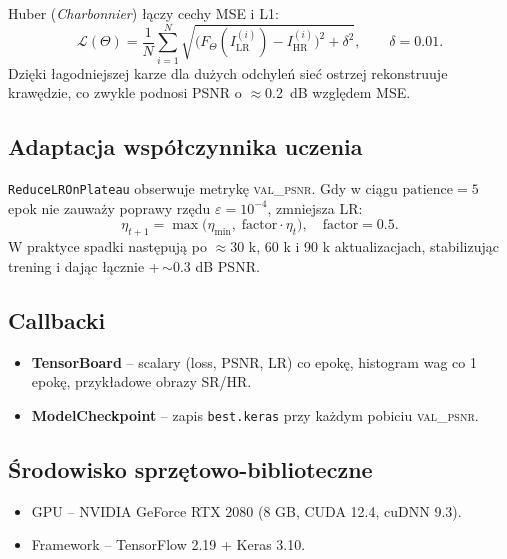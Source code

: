 \documentclass[11pt]{article}
\begin{document}
Huber (\textit{Charbonnier}) łączy cechy MSE i L1:
\begin{equation}
  \mathcal L(\Theta)=
  \frac{1}{N}\sum_{i=1}^{N}
  \sqrt{\bigl(F_\Theta(I^{(i)}_\mathrm{LR})-
              I^{(i)}_\mathrm{HR}\bigr)^{2}+\delta^{2}},
  \qquad \delta=0.01.
  \label{eq:huber}
\end{equation}
Dzięki łagodniejszej karze dla dużych odchyleń sieć ostrzej rekonstruuje
krawędzie, co zwykle podnosi PSNR o \(\approx\)\SI{0.2}{dB} względem MSE.

\subsection{Adaptacja współczynnika uczenia}

\texttt{ReduceLROnPlateau} obserwuje metrykę \textsc{val\_psnr}.
Gdy w ciągu \(\text{patience}=5\) epok nie zauważy poprawy rzędu
\(\varepsilon=10^{-4}\), zmniejsza LR:
\begin{equation}
  \eta_{t+1} =
  \max\bigl(\eta_\text{min},\;
            \text{factor}\cdot\eta_{t}\bigr),
  \quad
  \text{factor}=0.5.
  \label{eq:rlrop}
\end{equation}
W praktyce spadki następują po \(\approx\)30 k, 60 k i 90 k
aktualizacjach, stabilizując trening i dając łącznie
+\,\(\sim\)0.3 dB PSNR.

\subsection{Callbacki}

\begin{itemize}
  \item \textbf{TensorBoard} – scalary (loss, PSNR, LR) co epokę,
        histogram wag co 1 epokę, przykładowe obrazy SR/HR.
  \item \textbf{ModelCheckpoint} – zapis \texttt{best.keras} przy każdym
        pobiciu \textsc{val\_psnr}.
\end{itemize}

\subsection{Środowisko sprzętowo-biblioteczne}

\begin{itemize}
  \item GPU – NVIDIA GeForce RTX 2080 (8 GB, CUDA 12.4, cuDNN 9.3).
  \item Framework – TensorFlow 2.19 + Keras 3.10.
\end{itemize}
\end{document}
